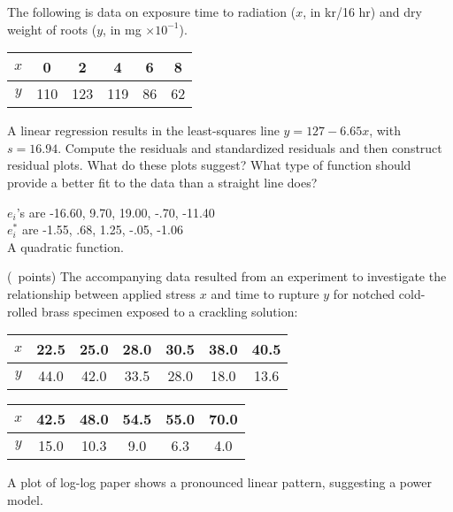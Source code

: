 \begin{questions}
\begin{parts}
    \end{parts}


    \question[4] The following is data on exposure time to radiation
    ($x$, in kr/16 hr) and dry weight of roots ($y$, in mg $\times
    10^{-1}$).

    \begin{tabular}{c|ccccc}
        $x$ & 0 & 2 & 4 & 6 & 8 \\
        \hline
        $y$ & 110 & 123 & 119 & 86 & 62 
    \end{tabular}

    A linear regression results in the least-squares line $y = 127 -
    6.65x$, with $s = 16.94$. Compute the residuals and standardized
    residuals and then construct residual plots. What do these plots
    suggest? What type of function should provide a better fit to the
    data than a straight line does?

    \begin{solution}

        $e_i$'s are -16.60, 9.70, 19.00, -.70, -11.40 \\
        $e_i^*$ are -1.55, .68, 1.25, -.05, -1.06 \\
        A quadratic function.

    \end{solution}


    \question (\totalpoints\ points) The accompanying data resulted
    from an experiment to investigate the relationship between applied
    stress $x$ and time to rupture $y$ for notched cold-rolled brass
    specimen exposed to a crackling solution:

    \begin{tabular}{c|cccccc}
        $x$ & 22.5 & 25.0 & 28.0 & 30.5 & 38.0 & 40.5 \\
        \hline
        $y$ & 44.0 & 42.0 & 33.5 & 28.0 & 18.0 & 13.6 
    \end{tabular}

    \begin{tabular}{c|ccccc}
        $x$ & 42.5 & 48.0 & 54.5 & 55.0 & 70.0 \\
        \hline
        $y$ & 15.0 & 10.3 & 9.0 & 6.3 & 4.0 
    \end{tabular}

    A plot of log-log paper shows a pronounced linear pattern,
    suggesting a power model.


\end{questions}
